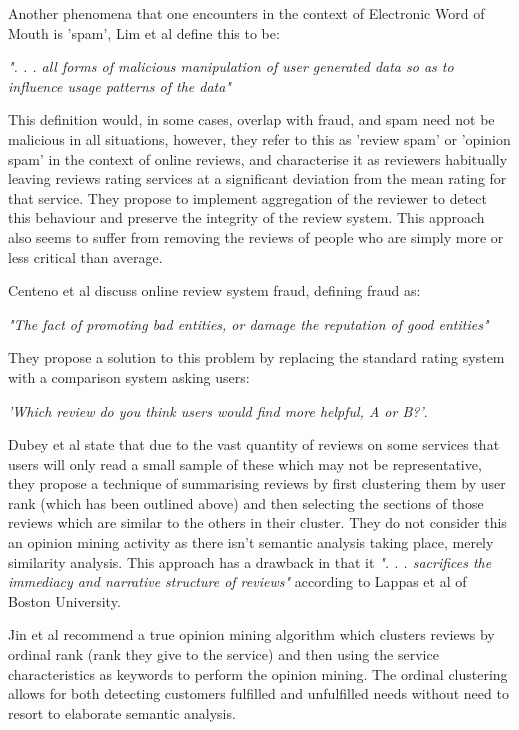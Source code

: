 Another phenomena that one encounters in the context of Electronic Word of Mouth is 'spam', Lim et al\cite{Lim} define this to be:

\emph{". . . all forms of malicious manipulation of user generated data so as to influence usage patterns of the data"}

This definition would, in some cases, overlap with fraud, and spam need not be malicious in all situations, however, they refer to this as 'review spam' or 'opinion spam' in the context of online reviews, and characterise it as reviewers habitually leaving reviews rating services at a significant deviation from the mean rating for that service. They propose to implement aggregation of the reviewer to detect this behaviour and preserve the integrity of the review system. This approach also seems to suffer from removing the reviews of people who are simply more or less critical than average.

Centeno et al\cite{Centeno} discuss online review system fraud, defining fraud as:

\emph{"The fact of promoting bad entities, or damage the reputation of good entities"} 

They propose a solution to this problem by replacing the standard rating system with a comparison system asking users:

\emph{'Which review do you think users would find more helpful, A or B?'}.

Dubey et al\cite{Dubey} state that due to the vast quantity of reviews on some services that users will only read a small sample of these which may not be representative, they propose a technique of summarising reviews by first clustering them by user rank (which has been outlined above) and then selecting the sections of those reviews which are similar to the others in their cluster. They do not consider this an opinion mining activity as there isn't semantic analysis taking place, merely similarity analysis. This approach has a drawback in that it \emph{". . . sacrifices the immediacy and narrative structure of reviews"}\cite{Lappas} according to Lappas et al of Boston University. 

Jin et al\cite{Jin} recommend a true opinion mining algorithm which clusters reviews by ordinal rank (rank they give to the service) and then using the service characteristics as keywords to perform the opinion mining. The ordinal clustering allows for both detecting customers fulfilled and unfulfilled needs without need to resort to elaborate semantic analysis.

